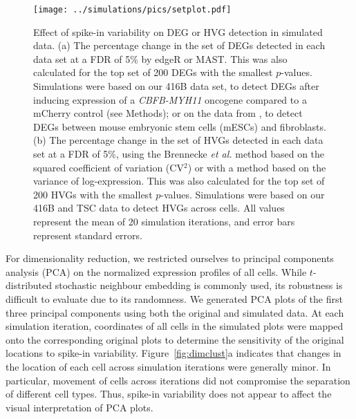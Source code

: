 \documentclass{article}
\begin{document}
\begin{figure}[bt]
    \begin{center}
        \texttt{[image: ../simulations/pics/setplot.pdf]}
    \end{center}
    \caption{Effect of spike-in variability on DEG or HVG detection in simulated data.
        (a) The percentage change in the set of DEGs detected in each data set at a FDR of 5\% by edgeR or MAST.
        This was also calculated for the top set of 200 DEGs with the smallest $p$-values.
        Simulations were based on our 416B data set, to detect DEGs after inducing expression of a \textit{CBFB-MYH11} oncogene compared to a mCherry control (see Methods);
        or on the data from \citet{islam2011characterization}, to detect DEGs between mouse embryonic stem cells (mESCs) and fibroblasts.
        (b) The percentage change in the set of HVGs detected in each data set at a FDR of 5\%,
        using the Brennecke \textit{et al.} method based on the squared coefficient of variation (CV$^2$) or with a method based on the variance of log-expression.
        This was also calculated for the top set of 200 HVGs with the smallest $p$-values.
        Simulations were based on our 416B and TSC data to detect HVGs across cells.
        All values represent the mean of 20 simulation iterations, and error bars represent standard errors.
    }
    \label{fig:setchange}
\end{figure}

For dimensionality reduction, we restricted ourselves to principal components analysis (PCA) on the normalized expression profiles of all cells. 
While $t$-distributed stochastic neighbour embedding \autocite{van2008visualizing} is commonly used, its robustness is difficult to evaluate due to its randomness.
We generated PCA plots of the first three principal components using both the original and simulated data.
At each simulation iteration, coordinates of all cells in the simulated plots were mapped onto the corresponding original plots to determine the sensitivity of the original locations to spike-in variability.
Figure~\ref{fig:dimclust}a indicates that changes in the location of each cell across simulation iterations were generally minor.
In particular, movement of cells across iterations did not compromise the separation of different cell types. 
Thus, spike-in variability does not appear to affect the visual interpretation of PCA plots.
\end{document}
